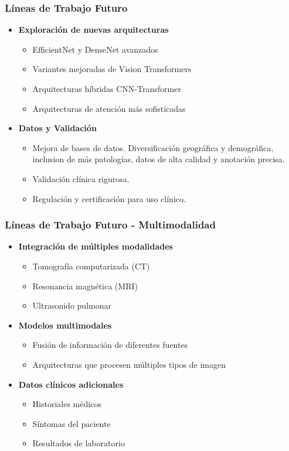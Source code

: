 \begin{frame}
\frametitle{Líneas de Trabajo Futuro}
\begin{itemize}
    \item \textbf{Exploración de nuevas arquitecturas}
    \begin{itemize}
        \item EfficientNet y DenseNet avanzados
        \item Variantes mejoradas de Vision Transformers
        \item Arquitecturas híbridas CNN-Transformer
        \item Arquitecturas de atención más sofisticadas
    \end{itemize}
    \item \textbf{Datos y Validación}
    \begin{itemize}
        \item Mejora de bases de datos. Diversificación geográfica y demográfica, inclusion de más patologías, datos de alta calidad y anotación precisa.
        \item Validación clínica rigurosa.
        \item Regulación y certificación para uso clínico.
    \end{itemize}
\end{itemize}
\end{frame}

\begin{frame}
\frametitle{Líneas de Trabajo Futuro - Multimodalidad}
\begin{itemize}
    \item \textbf{Integración de múltiples modalidades}
    \begin{itemize}
        \item Tomografía computarizada (CT)
        \item Resonancia magnética (MRI)
        \item Ultrasonido pulmonar
    \end{itemize}
    \item \textbf{Modelos multimodales}
    \begin{itemize}
        \item Fusión de información de diferentes fuentes
        \item Arquitecturas que procesen múltiples tipos de imagen
    \end{itemize}
    \item \textbf{Datos clínicos adicionales}
    \begin{itemize}
        \item Historiales médicos
        \item Síntomas del paciente
        \item Resultados de laboratorio
    \end{itemize}
\end{itemize}
\end{frame}

